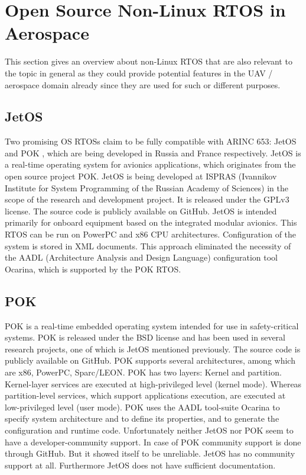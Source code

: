 \section{Open Source Non-Linux RTOS in Aerospace}
\label{sec:open-source-non-linux}

This section gives an overview about non-Linux RTOS that are also relevant to the topic in general as they could provide potential features in the UAV / aerospace domain already since they are used for such or different purposes.

\subsection{JetOS}
Two promising OS RTOSs claim to be fully compatible with ARINC 653: JetOS \cite{jetos2016} and POK \cite{pok2013}, which are being developed in Russia and France respectively. JetOS is a real-time operating system for avionics applications, which originates from the open source project POK. JetOS is being developed at ISPRAS (Ivannikov Institute for System Programming of the Russian Academy of Sciences) in the scope of the research and development project. It is released under the GPLv3 license. The source code is publicly available on GitHub. JetOS is intended primarily for onboard equipment based on the integrated modular avionics. This RTOS can be run on PowerPC and x86 CPU architectures. Configuration of the system is stored in XML documents. This approach eliminated the necessity of the AADL (Architecture Analysis and Design Language) configuration tool Ocarina, which is supported by the POK RTOS. %

\subsection{POK}
POK \cite{pok2013} is a real-time embedded operating system intended for use in safety-critical systems. POK is released under the BSD license and has been used in several research projects, one of which is JetOS mentioned previously. The source code is publicly available on GitHub. POK supports several architectures, among which are x86, PowerPC, Sparc/LEON. POK has two layers: Kernel and partition. Kernel-layer services are executed at high-privileged level (kernel mode). Whereas partition-level services, which support applications execution, are executed at low-privileged level (user mode). POK uses the AADL tool-suite Ocarina to specify system architecture and to define its properties, and to generate the configuration and runtime code.
Unfortunately neither JetOS nor POK seem to have a developer-community support. In case of POK community support is done through GitHub. But it showed itself to be unreliable. JetOS has no community support at all. Furthermore JetOS does not have suﬃcient documentation.

